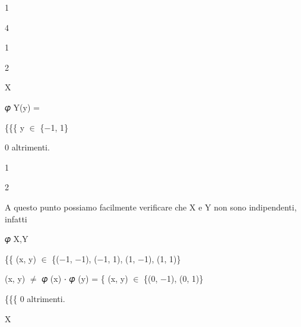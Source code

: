 \documentclass[a4paper,portrait,12pt]{article}
\begin{document}
1


4


1


2





\begin{flushleft}
X
\end{flushleft}





\begin{flushleft}
𝜑 Y(y) =
\end{flushleft}





\begin{flushleft}
\{\{\{ y $\in$ \{$-$1, 1\}
\end{flushleft}


\begin{flushleft}
0 altrimenti.
\end{flushleft}


1


2





\begin{flushleft}
A questo punto possiamo facilmente verificare che X e Y non sono indipendenti, infatti
\end{flushleft}





\begin{flushleft}
𝜑 X,Y
\end{flushleft}





\begin{flushleft}
\{\{ (x, y) $\in$ \{($-$1, $-$1), ($-$1, 1), (1, $-$1), (1, 1)\}
\end{flushleft}


\begin{flushleft}
(x, y) $\neq$ 𝜑 (x) ⋅ 𝜑 (y) = \{ (x, y) $\in$ \{(0, $-$1), (0, 1)\}
\end{flushleft}


\begin{flushleft}
\{\{\{ 0 altrimenti.
\end{flushleft}


\begin{flushleft}
X
\end{flushleft}
\end{document}
